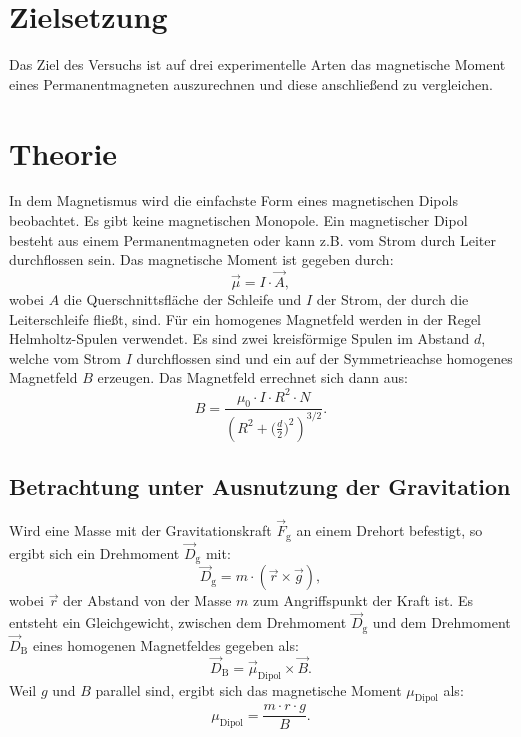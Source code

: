 \section{Zielsetzung}
Das Ziel des Versuchs ist auf drei experimentelle Arten das magnetische Moment eines Permanentmagneten auszurechnen und diese anschließend zu vergleichen. 

\section{Theorie}
In dem Magnetismus wird die einfachste Form eines magnetischen Dipols beobachtet. Es gibt keine magnetischen Monopole.
Ein magnetischer Dipol besteht aus einem Permanentmagneten oder kann z.B. vom Strom durch Leiter durchflossen sein. 
Das magnetische Moment ist gegeben durch:
\begin{equation*}
\vec{\mu}=I\cdot\vec{A}{,}
\end{equation*}
wobei $A$ die Querschnittsfläche der Schleife und $I$ der Strom, der durch die Leiterschleife fließt, sind.
Für ein homogenes Magnetfeld werden in der Regel Helmholtz-Spulen verwendet. Es sind zwei kreisförmige Spulen im Abstand $d$, welche vom Strom $I$ durchflossen sind und ein auf der Symmetrieachse homogenes Magnetfeld $B$ 
erzeugen.
Das Magnetfeld errechnet sich dann aus:
\begin{equation}
B=\frac{\mu_{0}\cdot I\cdot R^{2} \cdot N}{(R^{2}+\bigl(\frac{d}{2}\bigr)^{2})^{3/2}}.
\label{eq:flussdichte}
\end{equation}

\subsection{Betrachtung unter Ausnutzung der Gravitation}
Wird eine Masse mit der Gravitationskraft $\vec{F}_{\text{g}}$ an einem Drehort befestigt, so ergibt sich ein Drehmoment $\vec{D}_{\text{g}}$ mit:
\begin{equation*}
\vec{D}_{\text{g}}=m\cdot(\vec{r}\times\vec{g}){,}
\end{equation*}
wobei $\vec{r}$ der Abstand von der Masse $m$ zum  Angriffspunkt der Kraft ist.
Es entsteht ein Gleichgewicht, zwischen dem Drehmoment $\vec{D}_{\text{g}}$ und dem Drehmoment $\vec{D}_{\text{B}}$ eines homogenen Magnetfeldes gegeben als:
\begin{equation*}
\vec{D}_{\text{B}}= \vec{\mu}_{\text{Dipol}} \times \vec{B}.
\end{equation*}
Weil $g$ und $B$ parallel sind, ergibt sich das magnetische Moment ${\mu_{\text{Dipol}}}$ als:
\begin{equation}
\mu_{\text{Dipol}}=\frac{m\cdot r\cdot g}{B}.
\label{eq:udipol}
\end{equation}

